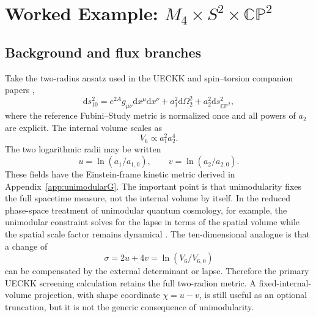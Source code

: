 \documentclass[aps,prd,twocolumn,superscriptaddress,nofootinbib,longbibliography]{revtex4-2}
\newcommand{\dd}{\mathrm d}
\newcommand{\CP}{\mathbb{CP}}
\begin{document}
\section{Worked Example: $M_4\times S^2\times\CP^2$}
\label{sec:s2cp2}

\subsection{Background and flux branches}
Take the two-radius ansatz used in the UECKK and spin--torsion companion papers \cite{ShayaUECKK2026,ShayaVacuum2026},
\begin{equation}
\dd s_{10}^2=e^{2A}g_{\mu\nu}\dd x^\mu\dd x^\nu+a_1^2\dd\Omega_2^2+a_2^2\dd s_{\CP^2}^2,
\end{equation}
where the reference Fubini--Study metric is normalized once and all powers of $a_2$ are explicit. The internal volume scales as
\begin{equation}
V_6\propto a_1^2a_2^4.
\end{equation}
The two logarithmic radii may be written
\begin{equation}
u=\ln(a_1/a_{1,0}),\qquad v=\ln(a_2/a_{2,0}).
\end{equation}
These fields have the Einstein-frame kinetic metric derived in Appendix~\ref{app:unimodularG}. The important point is that unimodularity fixes the full spacetime measure, not the internal volume by itself. In the reduced phase-space treatment of unimodular quantum cosmology, for example, the unimodular constraint solves for the lapse in terms of the spatial volume while the spatial scale factor remains dynamical \cite{Yamashita2026UnimodularQC}. The ten-dimensional analogue is that a change of
\begin{equation}
\sigma=2u+4v=\ln(V_6/V_{6,0})
\end{equation}
can be compensated by the external determinant or lapse. Therefore the primary UECKK screening calculation retains the full two-radion metric. A fixed-internal-volume projection, with shape coordinate \(\chi=u-v\), is still useful as an optional truncation, but it is not the generic consequence of unimodularity.
\end{document}
